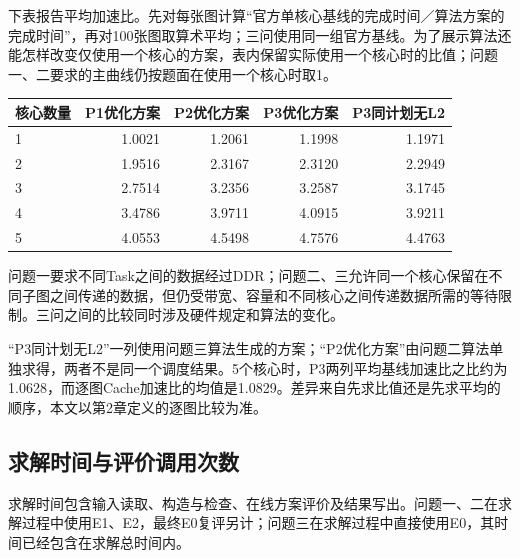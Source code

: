 \documentclass[anonymous,notoc]{gmcm2026}
\begin{document}
下表报告平均加速比。先对每张图计算``官方单核心基线的完成时间／算法方案的完成时间''，再对100张图取算术平均；三问使用同一组官方基线。为了展示算法还能怎样改变仅使用一个核心的方案，表内保留实际使用一个核心时的比值；问题一、二要求的主曲线仍按题面在使用一个核心时取1。

{\def\LTcaptype{table} %
\begin{table}[!htbp]\centering\small
\begin{tabular}{@{}lrrrr@{}}
\toprule\noalign{}
核心数量 & P1优化方案 & P2优化方案 & P3优化方案 & P3同计划无L2 \\
\midrule\noalign{}


1 & 1.0021 & 1.2061 & 1.1998 & 1.1971 \\
2 & 1.9516 & 2.3167 & 2.3120 & 2.2949 \\
3 & 2.7514 & 3.2356 & 3.2587 & 3.1745 \\
4 & 3.4786 & 3.9711 & 4.0915 & 3.9211 \\
5 & 4.0553 & 4.5498 & 4.7576 & 4.4763 \\
\bottomrule\end{tabular}
\end{table}
}

问题一要求不同Task之间的数据经过DDR；问题二、三允许同一个核心保留在不同子图之间传递的数据，但仍受带宽、容量和不同核心之间传递数据所需的等待限制。三问之间的比较同时涉及硬件规定和算法的变化。

``P3同计划无L2''一列使用问题三算法生成的方案；``P2优化方案''由问题二算法单独求得，两者不是同一个调度结果。5个核心时，P3两列平均基线加速比之比约为1.0628，而逐图Cache加速比的均值是1.0829。差异来自先求比值还是先求平均的顺序，本文以第2章定义的逐图比较为准。

\subsection{求解时间与评价调用次数}

求解时间包含输入读取、构造与检查、在线方案评价及结果写出。问题一、二在求解过程中使用E1、E2，最终E0复评另计；问题三在求解过程中直接使用E0，其时间已经包含在求解总时间内。
\end{document}
